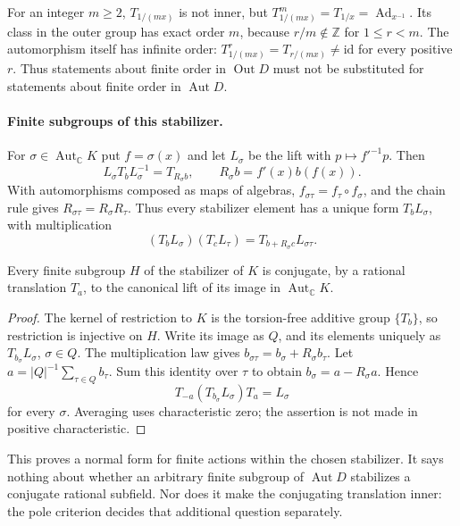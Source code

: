 \begin{example}
For an integer \(m\ge2\), \(T_{1/(mx)}\) is not inner, but
\(T_{1/(mx)}^m=T_{1/x}=\operatorname{Ad}_{x^{-1}}\). Its class in the outer
group has exact order \(m\), because \(r/m\notin\mathbb Z\) for
\(1\le r<m\). The automorphism itself has infinite order:
\(T_{1/(mx)}^r=T_{r/(mx)}\ne\mathrm{id}\) for every positive \(r\).
Thus statements about finite order in \(\operatorname{Out}D\) must not be
substituted for statements about finite order in \(\operatorname{Aut}D\).
\end{example}

\paragraph{Finite subgroups of this stabilizer.}
For \(\sigma\in\operatorname{Aut}_{\mathbb C}K\) put \(f=\sigma(x)\) and
let \(L_\sigma\) be the lift with \(p\mapsto f'^{-1}p\).
Then
\[
 L_\sigma T_b L_\sigma^{-1}=T_{R_\sigma b},\qquad
 R_\sigma b=f'(x)b(f(x)).
\]
With automorphisms composed as maps of algebras, \(f_{\sigma\tau}=
f_\tau\circ f_\sigma\), and the chain rule gives
\(R_{\sigma\tau}=R_\sigma R_\tau\). Thus every stabilizer element has a
unique form \(T_bL_\sigma\), with multiplication
\[
 (T_bL_\sigma)(T_cL_\tau)=T_{b+R_\sigma c}L_{\sigma\tau}.
\]

\begin{proposition}
Every finite subgroup \(H\) of the stabilizer of \(K\) is conjugate, by a
rational translation \(T_a\), to the canonical lift of its image in
\(\operatorname{Aut}_{\mathbb C}K\).
\end{proposition}
\begin{proof}
The kernel of restriction to \(K\) is the torsion-free additive group
\(\{T_b\}\), so restriction is injective on \(H\). Write its image as
\(Q\), and its elements uniquely as \(T_{b_\sigma}L_\sigma\),
\(\sigma\in Q\). The multiplication law gives
\(b_{\sigma\tau}=b_\sigma+R_\sigma b_\tau\).
Let \(a=|Q|^{-1}\sum_{\tau\in Q}b_\tau\). Sum this identity over \(\tau\)
to obtain \(b_\sigma=a-R_\sigma a\). Hence
\[
 T_{-a}(T_{b_\sigma}L_\sigma)T_a=L_\sigma
\]
for every \(\sigma\). Averaging uses characteristic zero; the assertion is
not made in positive characteristic.
\end{proof}

This proves a normal form for finite actions within the chosen stabilizer.
It says nothing about whether an arbitrary finite subgroup of
\(\operatorname{Aut}D\) stabilizes a conjugate rational subfield. Nor does
it make the conjugating translation inner: the pole criterion decides that
additional question separately.


